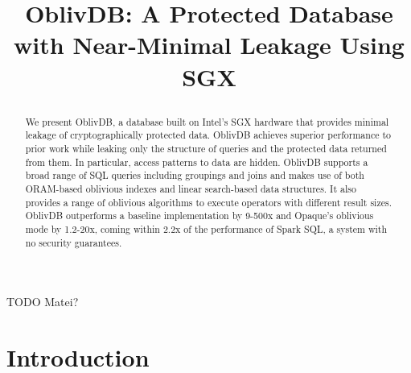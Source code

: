 \documentclass[conference]{IEEEtran}
\newcommand{\ignore}[1]{}
\def\name/{OblivDB}
\begin{document}
 

\title{\name/: A Protected Database with Near-Minimal Leakage Using SGX
\ignore{\thanks{Identify applicable funding agency here. If none, delete this.}}
}

\ignore{\author{\IEEEauthorblockN{1\textsuperscript{st} Given Name Surname}
\IEEEauthorblockA{\textit{dept. name of organization (of Aff.)} \\
\textit{name of organization (of Aff.)}\\
City, Country \\
email address}
\and
\IEEEauthorblockN{2\textsuperscript{nd} Given Name Surname}
\IEEEauthorblockA{\textit{dept. name of organization (of Aff.)} \\
\textit{name of organization (of Aff.)}\\
City, Country \\
email address}
}}

\maketitle

\begin{abstract}
We present \name/, a database built on Intel's SGX hardware that provides minimal leakage of cryptographically protected data. \name/ achieves superior performance to prior work while leaking only the structure of queries and the protected data returned from them. In particular, access patterns to data are hidden. \name/ supports a broad range of SQL queries including groupings and joins and makes use of both ORAM-based oblivious indexes and linear search-based data structures. It also provides a range of oblivious algorithms to execute operators with different result sizes. \name/ outperforms a baseline implementation by 9-500x and Opaque's oblivious mode \cite{ZDB+17} by 1.2-20x, coming within 2.2x of the performance of Spark SQL\cite{SparkSQL}, a system with no security guarantees.  
\end{abstract}

\begin{IEEEkeywords}
TODO Matei?
\end{IEEEkeywords}

\section{Introduction}
\end{document}
